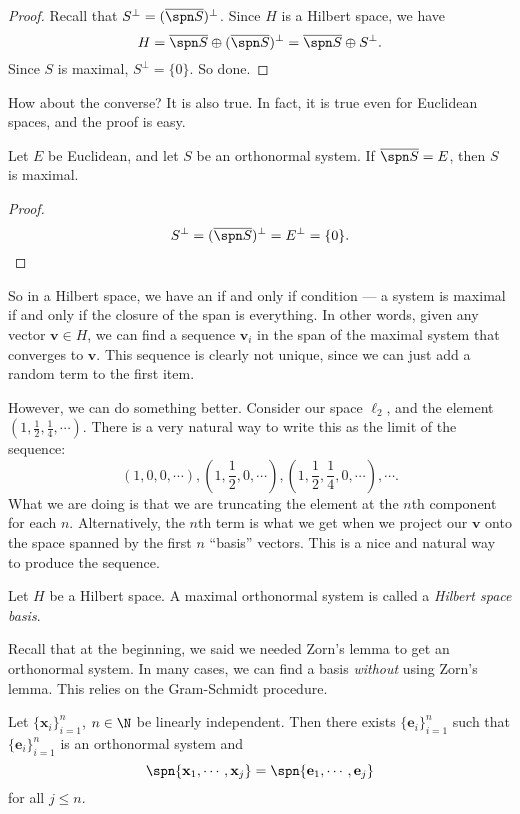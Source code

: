 \documentclass[a4paper]{article}
\begin{document}
\begin{proof}
  Recall that $S^\perp = (\overline{\spn S})^\perp$. Since $H$ is a Hilbert space, we have
  \[
    H = \overline{\spn S} \oplus (\overline{\spn S})^\perp = \overline{\spn S} \oplus S^\perp.
  \]
  Since $S$ is maximal, $S^\perp = \{0\}$. So done.
\end{proof}

How about the converse? It is also true. In fact, it is true even for Euclidean spaces, and the proof is easy.

\begin{prop}
  Let $E$ be Euclidean, and let $S$ be an orthonormal system. If $\overline{\spn S} = E$, then $S$ is maximal.
\end{prop}

\begin{proof}
  \[
    S^\perp = (\overline{\spn S})^\perp = E^\perp = \{0\}.
  \]
\end{proof}
So in a Hilbert space, we have an if and only if condition --- a system is maximal if and only if the closure of the span is everything. In other words, given any vector $\mathbf{v} \in H$, we can find a sequence $\mathbf{v}_i$ in the span of the maximal system that converges to $\mathbf{v}$. This sequence is clearly not unique, since we can just add a random term to the first item.

However, we can do something better. Consider our space $\ell_2$, and the element $(1, \frac{1}{2}, \frac{1}{4}, \cdots)$. There is a very natural way to write this as the limit of the sequence:
\[
  (1, 0, 0, \cdots), \left(1, \frac{1}{2}, 0, \cdots\right), \left(1, \frac{1}{2}, \frac{1}{4}, 0, \cdots\right), \cdots.
\]
What we are doing is that we are truncating the element at the $n$th component for each $n$. Alternatively, the $n$th term is what we get when we project our $\mathbf{v}$ onto the space spanned by the first $n$ ``basis'' vectors. This is a nice and natural way to produce the sequence.

\begin{defi}
  Let $H$ be a Hilbert space. A maximal orthonormal system is called a \emph{Hilbert space basis}.
\end{defi}

Recall that at the beginning, we said we needed Zorn's lemma to get an orthonormal system. In many cases, we can find a basis \emph{without} using Zorn's lemma. This relies on the Gram-Schmidt procedure.

\begin{prop}
  Let $\{\mathbf{x}_i\}_{i = 1}^n$, $n \in \N$ be linearly independent. Then there exists $\{\mathbf{e}_i\}_{i = 1}^n$ such that $\{\mathbf{e}_i\}_{i = 1}^n$ is an orthonormal system and
  \[
    \spn\{\mathbf{x}_1, \cdots, \mathbf{x}_j\} = \spn\{\mathbf{e}_1, \cdots, \mathbf{e}_j\}
  \]
  for all $j \leq n$.
\end{prop}
\end{document}
